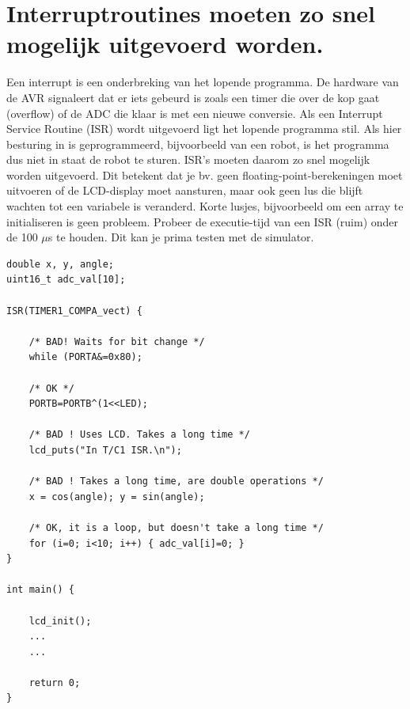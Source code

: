 \documentclass[12pt,a4paper,final,oneside,fleqn]{article}
\begin{document}
\section{Interruptroutines moeten zo snel mogelijk uitgevoerd worden.}
\label{sec:intsnel}
Een interrupt is een onderbreking van het lopende programma. De hardware
van de AVR signaleert dat er iets gebeurd is zoals een timer die over de
kop gaat (overflow) of de ADC die klaar is met een nieuwe conversie. Als
een Interrupt Service Routine (ISR) wordt uitgevoerd ligt het lopende
programma stil. Als hier besturing in is geprogrammeerd, bijvoorbeeld van
een robot, is het programma dus niet in staat de robot te sturen. ISR's
moeten daarom zo snel mogelijk worden uitgevoerd. Dit betekent dat je bv.
geen floating-point-berekeningen moet uitvoeren of de LCD-display moet
aansturen, maar ook geen lus die blijft wachten tot een variabele is
veranderd. Korte lusjes, bijvoorbeeld om een array te initialiseren is
geen probleem. Probeer de executie-tijd van een ISR (ruim) onder de 100
$\mu$s te houden. Dit kan je prima testen met de simulator.

\begin{lstlisting}[style=numbers,caption=ISR's moeten kort duren]
double x, y, angle;
uint16_t adc_val[10];

ISR(TIMER1_COMPA_vect) {

	/* BAD! Waits for bit change */
	while (PORTA&=0x80);

	/* OK */
	PORTB=PORTB^(1<<LED);

	/* BAD ! Uses LCD. Takes a long time */
	lcd_puts("In T/C1 ISR.\n");

	/* BAD ! Takes a long time, are double operations */
	x = cos(angle); y = sin(angle);

	/* OK, it is a loop, but doesn't take a long time */
	for (i=0; i<10; i++) { adc_val[i]=0; }
}

int main() {

	lcd_init();
	...
	...
	
	return 0;
}
\end{lstlisting}

\end{document}
